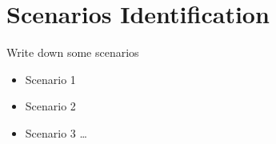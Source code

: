 \chapter{Scenarios Identification}

	Write down some scenarios

	\begin{itemize}
		\item Scenario 1
		\item Scenario 2
		\item Scenario 3 \ldots
	\end{itemize}